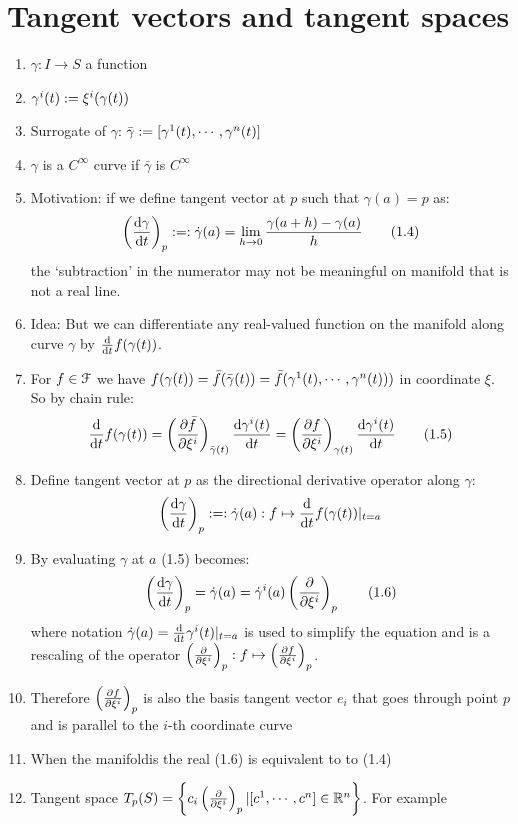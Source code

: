 \documentclass{article}
\begin{document}
	\section{Tangent vectors and tangent spaces}
	\begin{enumerate}
		\item $\gamma:I\rightarrow S$ a function
		\item $\gamma^i(t):=\xi^i(\gamma(t))$
		\item Surrogate of $\gamma$: $\bar{\gamma}:=[\gamma^1(t),\cdots,\gamma^n(t)]$
		\item $\gamma$ is a $C^\infty$ curve if $\bar{\gamma}$ is $C^\infty$ 
		\item Motivation: if we define tangent vector at $p$ such that $\gamma(a)=p$ as:
		\[\left(\frac{\mathrm{d} \gamma}{\mathrm{d} t}\right)_p:=:\dot{\gamma}(a)=\lim_{h\rightarrow0}\frac{\gamma(a+h)-\gamma(a)}{h}\qquad(1.4)\]
		the `subtraction' in the numerator may not be meaningful on manifold that is not a real line. 
		\item Idea: But we can differentiate any real-valued function on the manifold along curve $\gamma$ by $\frac{\mathrm{d} }{\mathrm{d} t}f(\gamma(t))$. 
		\item For $f\in\mathcal{F}$ we have $f(\gamma(t))=\bar{f}(\bar{\gamma}(t))=\bar{f}(\gamma^1(t),\cdots,\gamma^n(t)))$ in coordinate $\xi$. So by chain rule: 
		\[\frac{\mathrm{d} }{\mathrm{d} t}f(\gamma(t))=\left(\frac{\partial \bar{f}}{\partial \xi^i}\right)_{\bar{\gamma}(t)}\frac{\mathrm{d} \gamma^i(t)}{\mathrm{d} t}=\left(\frac{\partial f}{\partial \xi^i}\right)_{\gamma(t)}\frac{\mathrm{d} \gamma^i(t)}{\mathrm{d} t}\qquad(1.5)\]
		\item Define tangent vector at $p$ as the directional derivative operator along $\gamma$:
		\[\left(\frac{\mathrm{d} \gamma}{\mathrm{d} t}\right)_p:=:\dot{\gamma}(a):f\mapsto\frac{\mathrm{d} }{\mathrm{d} t}f(\gamma(t))|_{t=a}\] 
		\item By evaluating $\gamma$ at $a$ (1.5) becomes:
		\[
			\left(\frac{\mathrm{d} \gamma}{\mathrm{d} t}\right)_p=\dot{\gamma}(a)=\dot{\gamma}^i(a)\left(\frac{\partial }{\partial \xi^i}\right)_p\qquad(1.6)
		\]
		where notation $\dot{\gamma}(a)=\frac{\mathrm{d} }{\mathrm{d} t}\gamma^i(t)|_{t=a}$ is used to simplify the equation and is a rescaling of the operator $\left(\frac{\partial }{\partial \xi^i}\right)_p:f\mapsto\left(\frac{\partial f}{\partial \xi^i}\right)_p$.
		\item Therefore $\left(\frac{\partial f}{\partial \xi^i}\right)_p$ is also the basis tangent vector $e_i$ that goes through point $p$ and is parallel to the $i$-th coordinate curve
		\item When the manifoldis the real (1.6) is equivalent to to (1.4)
		\item Tangent space $T_p(S)=\left\{c_i\left(\frac{\partial }{\partial \xi^i}\right)_p|[c^1,\cdots,c^n]\in\mathbb{R}^n\right\}$. For example

\end{enumerate}
\end{document}
